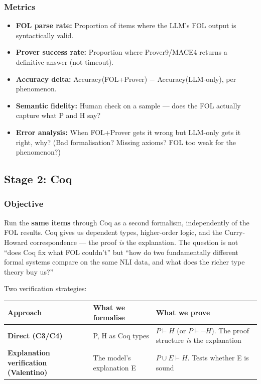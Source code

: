 \documentclass[11pt,a4paper]{article}
\begin{document}
\subsubsection{Metrics}

\begin{itemize}[nosep,leftmargin=1.5em]
\item \textbf{FOL parse rate:} Proportion of items where the LLM's FOL output is syntactically valid.
\item \textbf{Prover success rate:} Proportion where Prover9/MACE4 returns a definitive answer (not timeout).
\item \textbf{Accuracy delta:} Accuracy(FOL+Prover) $-$ Accuracy(LLM-only), per phenomenon.
\item \textbf{Semantic fidelity:} Human check on a sample --- does the FOL actually capture what P and H say?
\item \textbf{Error analysis:} When FOL+Prover gets it wrong but LLM-only gets it right, why? (Bad formalisation? Missing axioms? FOL too weak for the phenomenon?)
\end{itemize}

\subsection{Stage 2: Coq}

\subsubsection{Objective}

Run the \textbf{same items} through Coq as a second formalism, independently of the FOL results. Coq gives us dependent types, higher-order logic, and the Curry-Howard correspondence --- the proof \emph{is} the explanation. The question is not ``does Coq fix what FOL couldn't'' but ``how do two fundamentally different formal systems compare on the same NLI data, and what does the richer type theory buy us?''

Two verification strategies:

\begin{table}[h!]
\centering\small
\begin{tabularx}{\textwidth}{l l X}
\toprule
\textbf{Approach} & \textbf{What we formalise} & \textbf{What we prove} \\
\midrule
\textbf{Direct (C3/C4)} & P, H as Coq types & $P \vdash H$ (or $P \vdash \neg H$). The proof structure \emph{is} the explanation \\[4pt]
\textbf{Explanation verification (Valentino)} & The model's explanation E & $P \cup E \vdash H$. Tests whether E is sound \\
\bottomrule
\end{tabularx}
\end{table}
\end{document}

